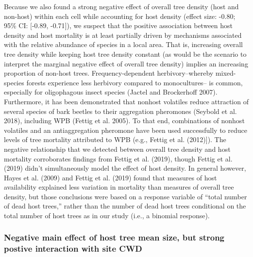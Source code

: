 \documentclass[]{article}
\begin{document}
Because we also found a strong negative effect of overall tree density
(host and non-host) within each cell while accounting for host density
(effect size: -0.80; 95\% CI: {[}-0.89, -0.71{]}), we suspect that the
positive association between host density and host mortality is at least
partially driven by mechanisms associated with the relative abundance of
species in a local area. That is, increasing overall tree density while
keeping host tree density constant (as would be the scenario to
interpret the marginal negative effect of overall tree density) implies
an increasing proportion of non-host trees. Frequency-dependent
herbivory--whereby mixed-species forests experience less herbivory
compared to monocultures-- is common, especially for oligophagous insect
species (Jactel and Brockerhoff 2007). Furthermore, it has been
demonstrated that nonhost volatiles reduce attraction of several species
of bark beetles to their aggregation pheromones (Seybold et al. 2018),
including WPB (Fettig et al. 2005). To that end, combinations of nonhost
volatiles and an antiaggregation pheromone have been used successfully
to reduce levels of tree mortality attributed to WPB (e.g., Fettig et
al. (2012){]}). The negative relationship that we detected between
overall tree density and host mortality corroborates findings from
Fettig et al. (2019), though Fettig et al. (2019) didn't simultaneously
model the effect of host density. In general however, Hayes et al.
(2009) and Fettig et al. (2019) found that measures of host availability
explained less variation in mortality than measures of overall tree
density, but those conclusions were based on a response variable of
``total number of dead host trees,'' rather than the number of dead host
trees conditional on the total number of host trees as in our study
(i.e., a binomial response).

\hypertarget{negative-main-effect-of-host-tree-mean-size-but-strong-postive-interaction-with-site-cwd}{%
\subsubsection{Negative main effect of host tree mean size, but strong
postive interaction with site
CWD}\label{negative-main-effect-of-host-tree-mean-size-but-strong-postive-interaction-with-site-cwd}}
\end{document}
